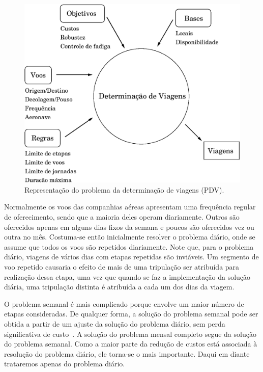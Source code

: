 \begin{figure}[htbp]
	\begin{center}
		\includegraphics[scale=0.5]{fig/pdv.eps}
		\caption{Representação do problema da determinação de viagens (PDV).}
		\label{fig:pdv}
	\end{center}
\end{figure}

Normalmente os voos das companhias aéreas apresentam uma frequência regular de oferecimento, sendo
que a maioria deles operam diariamente. Outros são oferecidos apenas em alguns dias fixos da semana
e poucos são oferecidos vez ou outra no mês. Costuma-se então inicialmente resolver o problema
diário, onde se assume que todos os voos são repetidos diariamente. Note que, para o problema
diário, viagens de vários dias com etapas repetidas são inviáveis. Um segmento de voo repetido
causaria o efeito de mais de uma tripulação ser atribuída para realização dessa etapa, uma vez que
quando se faz a implementação da solução diária, uma tripulação distinta é atribuída a cada um dos
dias da viagem.

O problema semanal é mais complicado porque envolve um maior número de etapas consideradas. De
qualquer forma, a solução do problema semanal pode ser obtida a partir de um ajuste da solução do
problema diário, sem perda significativa de custo~\cite{gopalakrishnan05}. A solução do problema
mensal completo segue da solução do problema semanal. Como a maior parte da redução de custos está
associada à resolução do problema diário, ele torna-se o mais importante. Daqui em diante trataremos
apenas do problema diário.

